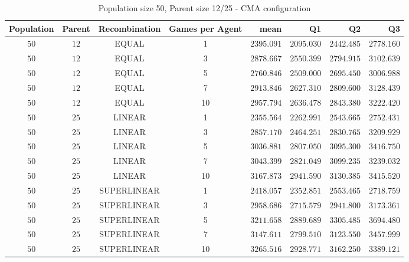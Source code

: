 \begin{table}[H]
\centering
\small
\begin{tabular}{c c c c r r r r}
Population & Parent & Recombination & Games per Agent & mean & Q1 & Q2 & Q3\\
\hline
$50$ & $12$ & EQUAL & 1 & $2395.091$ & $2095.030$ & $2442.485$ & $2778.160$\\
$50$ & $12$ & EQUAL & 3 & $2878.667$ & $2550.399$ & $2794.915$ & $3102.639$\\
$50$ & $12$ & EQUAL & 5 & $2760.846$ & $2509.000$ & $2695.450$ & $3006.988$\\
$50$ & $12$ & EQUAL & 7 & $2913.846$ & $2627.310$ & $2809.600$ & $3128.439$\\
\hdashline
$50$ & $12$ & EQUAL & 10 & $2957.794$ & $2636.478$ & $2843.380$ & $3222.420$\\
\hdashline
$50$ & $25$ & LINEAR & 1 & $2355.564$ & $2262.991$ & $2543.665$ & $2752.431$\\
$50$ & $25$ & LINEAR & 3 & $2857.170$ & $2464.251$ & $2830.765$ & $3209.929$\\
$50$ & $25$ & LINEAR & 5 & $3036.881$ & $2807.050$ & $3095.300$ & $3416.750$\\
$50$ & $25$ & LINEAR & 7 & $3043.399$ & $2821.049$ & $3099.235$ & $3239.032$\\
\hdashline
$50$ & $25$ & LINEAR & 10 & $3167.873$ & $2941.590$ & $3130.385$ & $3415.520$\\
\hdashline
$50$ & $25$ & SUPERLINEAR & 1 & $2418.057$ & $2352.851$ & $2553.465$ & $2718.759$\\
$50$ & $25$ & SUPERLINEAR & 3 & $2958.686$ & $2715.579$ & $2941.800$ & $3173.361$\\
\hdashline
$50$ & $25$ & SUPERLINEAR & 5 & $3211.658$ & $2889.689$ & $3305.485$ & $3694.480$\\
\hdashline
$50$ & $25$ & SUPERLINEAR & 7 & $3147.611$ & $2799.510$ & $3123.550$ & $3457.999$\\
$50$ & $25$ & SUPERLINEAR & 10 & $3265.516$ & $2928.771$ & $3162.250$ & $3389.121$\\
\end{tabular}
\caption{Population size 50, Parent size 12/25 - CMA configuration}
\end{table}


